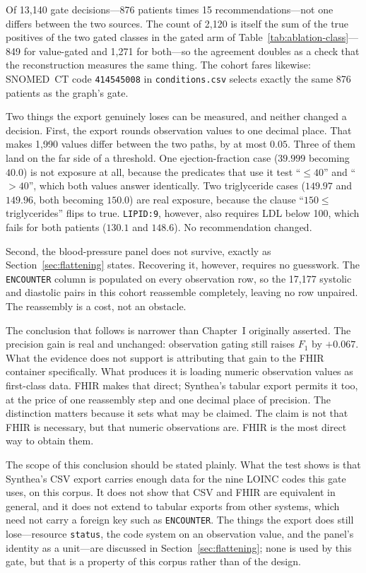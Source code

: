 Of 13{,}140 gate decisions---876 patients times 15 recommendations---not one differs between the
two sources. The count of 2{,}120 is itself the sum of the true positives of the two gated
classes in the gated arm of Table~\ref{tab:ablation-class}---849 for value-gated and 1{,}271 for
both---so the agreement doubles as a check that the reconstruction measures the same thing. The
cohort fares likewise: SNOMED~CT code \texttt{414545008} in \texttt{conditions.csv} selects
exactly the same 876 patients as the graph's gate.

Two things the export genuinely loses can be measured, and neither changed a decision. First,
the export rounds observation values to one decimal place. That makes 1{,}990 values differ
between the two paths, by at most $0.05$. Three of them land on the far side of a threshold. One
ejection-fraction case ($39.999$ becoming $40.0$) is not exposure at all, because the predicates
that use it test ``$\le 40$'' and ``$> 40$'', which both values answer identically. Two triglyceride cases ($149.97$ and $149.96$, both becoming $150.0$) are real exposure,
because the clause ``$150 \le$ triglycerides'' flips to true. \texttt{LIPID:9}, however,
also requires LDL below 100, which fails for both patients ($130.1$ and $148.6$). No recommendation changed.

Second, the blood-pressure panel does not survive, exactly as Section~\ref{sec:flattening} states.
Recovering it, however, requires no guesswork. The \texttt{ENCOUNTER} column is populated on every
observation row, so the 17{,}177 systolic and diastolic pairs in this cohort reassemble completely,
leaving no row unpaired. The reassembly is a cost, not an obstacle.

The conclusion that follows is narrower than Chapter~I originally asserted. The precision gain is
real and unchanged: observation gating still raises $F_1$ by $+0.067$. What the evidence does not
support is attributing that gain to the FHIR container specifically. What produces it is loading
numeric observation values as first-class data. FHIR makes that direct; Synthea's tabular export
permits it too, at the price of one reassembly step and one decimal place of precision. The distinction matters because it sets what may be claimed. The claim is not that FHIR is
necessary, but that numeric observations are. FHIR is the most direct way to obtain them.

The scope of this conclusion should be stated plainly. What the test shows is that Synthea's CSV
export carries enough data for the nine LOINC codes this gate uses, on this corpus. It does not
show that CSV and FHIR are equivalent in general, and it does not extend to tabular exports from
other systems, which need not carry a foreign key such as \texttt{ENCOUNTER}. The things the
export does still lose---resource \texttt{status}, the code system on an observation value, and
the panel's identity as a unit---are discussed in Section~\ref{sec:flattening}; none is used by
this gate, but that is a property of this corpus rather than of the design.

